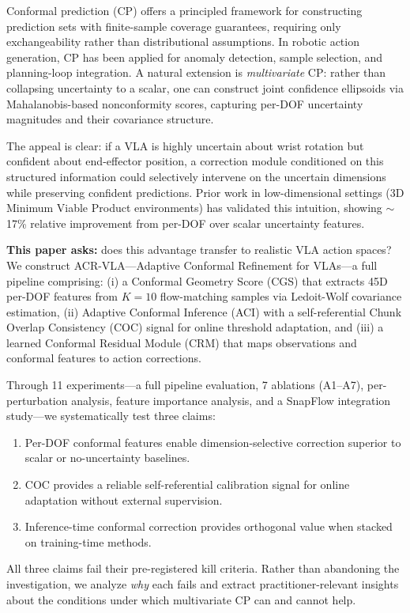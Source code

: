 \documentclass[letterpaper]{article}
\begin{document}
Conformal prediction (CP) offers a principled framework for constructing prediction sets with finite-sample coverage guarantees, requiring only exchangeability rather than distributional assumptions.
In robotic action generation, CP has been applied for anomaly detection, sample selection, and planning-loop integration.
A natural extension is \emph{multivariate} CP: rather than collapsing uncertainty to a scalar, one can construct joint confidence ellipsoids via Mahalanobis-based nonconformity scores, capturing per-DOF uncertainty magnitudes and their covariance structure.

The appeal is clear: if a VLA is highly uncertain about wrist rotation but confident about end-effector position, a correction module conditioned on this structured information could selectively intervene on the uncertain dimensions while preserving confident predictions.
Prior work in low-dimensional settings (3D Minimum Viable Product environments) has validated this intuition, showing $\sim$17\% relative improvement from per-DOF over scalar uncertainty features.

\textbf{This paper asks:} does this advantage transfer to realistic VLA action spaces?
We construct ACR-VLA---Adaptive Conformal Refinement for VLAs---a full pipeline comprising:
(i) a Conformal Geometry Score (CGS) that extracts 45D per-DOF features from $K{=}10$ flow-matching samples via Ledoit-Wolf covariance estimation,
(ii) Adaptive Conformal Inference (ACI) with a self-referential Chunk Overlap Consistency (COC) signal for online threshold adaptation, and
(iii) a learned Conformal Residual Module (CRM) that maps observations and conformal features to action corrections.

Through 11 experiments---a full pipeline evaluation, 7 ablations (A1--A7), per-perturbation analysis, feature importance analysis, and a SnapFlow integration study---we systematically test three claims:
\begin{enumerate}[nosep]
\item Per-DOF conformal features enable dimension-selective correction superior to scalar or no-uncertainty baselines.
\item COC provides a reliable self-referential calibration signal for online adaptation without external supervision.
\item Inference-time conformal correction provides orthogonal value when stacked on training-time methods.
\end{enumerate}

All three claims fail their pre-registered kill criteria.
Rather than abandoning the investigation, we analyze \emph{why} each fails and extract practitioner-relevant insights about the conditions under which multivariate CP can and cannot help.
\end{document}
